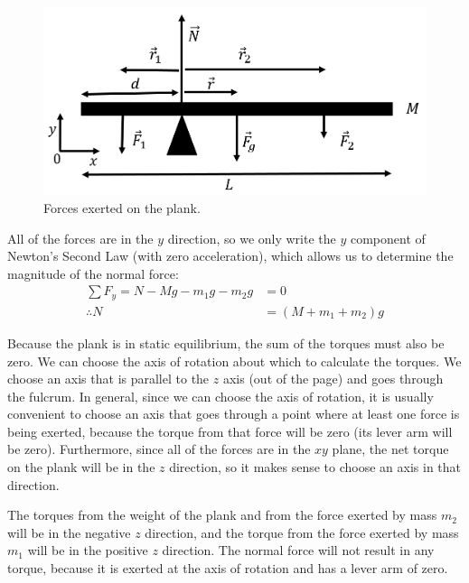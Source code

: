 \begin{framed}
\begin{framed}
\begin{figure}[!htbp]
\centering
\includegraphics[width=0.375\linewidth]{files/scale_fbd-6fe39975f4790393f62e15e2de0cb66f.png}
\caption[]{Forces exerted on the plank.}
\label{fig:rotationaldynamics:scale_fbd}
\end{figure}

All of the forces are in the $y$ direction, so we only write the $y$ component of Newton's Second Law (with zero acceleration), which allows us to determine the magnitude of the normal force:
\begin{align*}
\sum F_y = N - Mg -m_1g - m_2 g &=0\\
\therefore N &= (M+m_1+m_2) g
\end{align*}

Because the plank is in static equilibrium, the sum of the torques must also be zero. We can choose the axis of rotation about which to calculate the torques. We choose an axis that is parallel to the $z$ axis (out of the page) and goes through the fulcrum. In general, since we can choose the axis of rotation, it is usually convenient to choose an axis that goes through a point where at least one force is being exerted, because the torque from that force will be zero (its lever arm will be zero).  Furthermore, since all of the forces are in the $xy$ plane, the net torque on the plank will be in the $z$ direction, so it makes sense to choose an axis in that direction.

The torques from the weight of the plank and from the force exerted by mass $m_2$ will be in the negative $z$ direction, and the torque from the force exerted by mass $m_1$ will be in the positive $z$ direction. The normal force will not result in any torque, because it is exerted at the axis of rotation and has a lever arm of zero.


\end{framed}
\end{framed}
